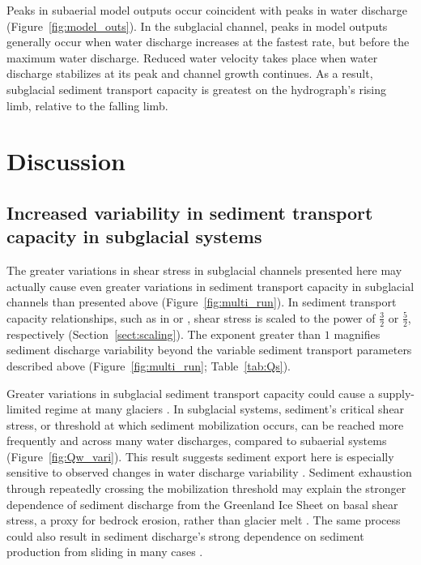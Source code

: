 \documentclass[esurf, manuscript]{copernicus}
\begin{document}
Peaks in subaerial model outputs occur coincident with peaks in water discharge (Figure~\ref{fig:model_outs}).
In the subglacial channel, peaks in model outputs generally occur when water discharge increases at the fastest rate, but before the maximum water discharge.
Reduced water velocity takes place when water discharge stabilizes at its peak and channel growth continues.
As a result, subglacial sediment transport capacity is greatest on the hydrograph's rising limb, relative to the falling limb. 

\FloatBarrier
\section{Discussion}

\subsection{Increased variability in  sediment transport capacity in subglacial systems}
\label{sect:dis_qsc}

The greater variations in shear stress in subglacial channels presented here may actually cause even greater variations in sediment transport capacity in subglacial channels than presented above  (Figure~\ref{fig:multi_run}).
In sediment transport capacity relationships, such as in \citet{meyer1948} or \citet{engelund1967}, shear stress is scaled to the power of $\frac{3}{2}$ or $\frac{5}{2}$, respectively (Section~\ref{sect:scaling}).
The exponent greater than $1$ magnifies sediment discharge variability beyond the variable sediment transport parameters described above (Figure~\ref{fig:multi_run}; Table~\ref{tab:Qs}).

Greater variations in subglacial sediment transport capacity could cause a supply-limited regime at many glaciers \citep{alley1997}.
In subglacial systems, sediment's critical shear stress, or threshold at which sediment mobilization occurs, can be reached more frequently and across many water discharges, compared to subaerial systems (Figure~\ref{fig:Qw_vari}).
This result suggests sediment export here is especially sensitive to observed changes in water discharge variability \citep{lane2019b}.
Sediment exhaustion through repeatedly crossing the mobilization threshold may explain the stronger dependence of sediment discharge from the Greenland Ice Sheet on basal shear stress, a proxy for bedrock erosion, rather than glacier melt \citep{overeem2017}.
The same process could also result in sediment discharge's strong dependence on sediment production from sliding in many cases \citep{herman2015,koppes2015}.
\end{document}
